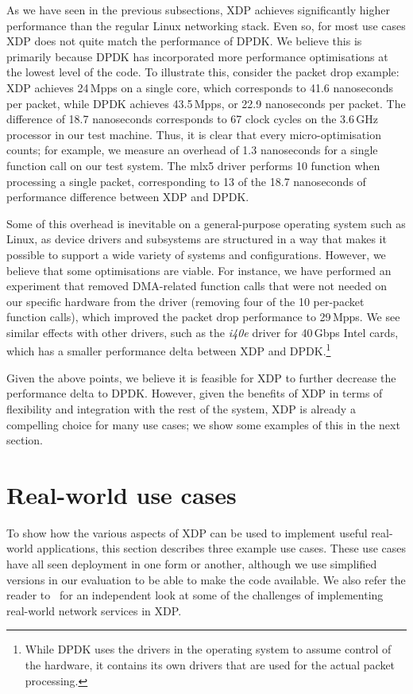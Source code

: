 \documentclass[sigconf]{acmart}
\begin{document}
As we have seen in the previous subsections, XDP achieves significantly higher
performance than the regular Linux networking stack. Even so, for most use cases
XDP does not quite match the performance of DPDK. We believe this is primarily
because DPDK has incorporated more performance optimisations at the lowest level
of the code. To illustrate this, consider the packet drop example: XDP achieves
24\,Mpps on a single core, which corresponds to 41.6 nanoseconds per packet,
while DPDK achieves 43.5\,Mpps, or 22.9 nanoseconds per packet. The difference
of 18.7 nanoseconds corresponds to 67 clock cycles on the 3.6\,GHz processor in
our test machine. Thus, it is clear that every micro-optimisation counts; for
example, we measure an overhead of 1.3 nanoseconds for a single function call on
our test system. The mlx5 driver performs 10 function when processing a single
packet, corresponding to 13 of the 18.7 nanoseconds of performance difference
between XDP and DPDK.

Some of this overhead is inevitable on a general-purpose operating system such
as Linux, as device drivers and subsystems are structured in a way that makes it
possible to support a wide variety of systems and configurations. However, we
believe that some optimisations are viable. For instance, we have performed an
experiment that removed DMA-related function calls that were not needed on our
specific hardware from the driver (removing four of the 10 per-packet function
calls), which improved the packet drop performance to 29\,Mpps. We see similar
effects with other drivers, such as the \emph{i40e} driver for 40\,Gbps Intel
cards, which has a smaller performance delta between XDP and
DPDK.\footnote{While DPDK uses the drivers in the operating system to assume
  control of the hardware, it contains its own drivers that are used for the
  actual packet processing.}

Given the above points, we believe it is feasible for XDP to further decrease
the performance delta to DPDK. However, given the benefits of XDP in terms of
flexibility and integration with the rest of the system, XDP is already a
compelling choice for many use cases; we show some examples of this in the next
section.

\section{Real-world use cases}
\label{sec:usecases}
To show how the various aspects of XDP can be used to implement useful
real-world applications, this section describes three example use cases. These
use cases have all seen deployment in one form or another, although we use
simplified versions in our evaluation to be able to make the code available. We
also refer the reader to~\cite{miano2018creating} for an independent look at
some of the challenges of implementing real-world network services in XDP.
\end{document}
